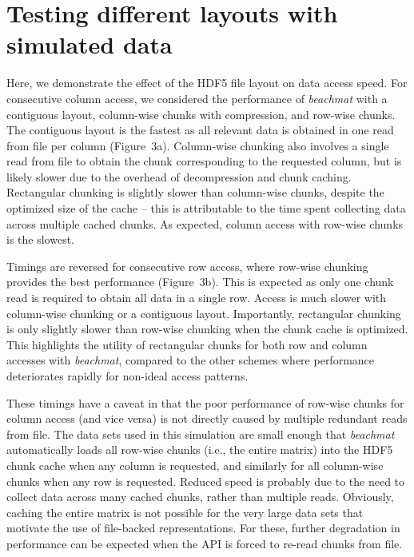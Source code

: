 \documentclass{article}
\newcommand{\beachmat}{\textit{beachmat}}
\begin{document}
\section{Testing different layouts with simulated data}
Here, we demonstrate the effect of the HDF5 file layout on data access speed.
For consecutive column access, we considered the performance of \beachmat{} with a contiguous layout, column-wise chunks with compression, and row-wise chunks.
The contiguous layout is the fastest as all relevant data is obtained in one read from file per column (Figure~3a).
Column-wise chunking also involves a single read from file to obtain the chunk corresponding to the requested column, but is likely slower due to the overhead of decompression and chunk caching.
Rectangular chunking is slightly slower than column-wise chunks, despite the optimized size of the cache -- this is attributable to the time spent collecting data across multiple cached chunks.
As expected, column access with row-wise chunks is the slowest.

Timings are reversed for consecutive row access, where row-wise chunking provides the best performance (Figure~3b).
This is expected as only one chunk read is required to obtain all data in a single row.
Access is much slower with column-wise chunking or a contiguous layout.
Importantly, rectangular chunking is only slightly slower than row-wise chunking when the chunk cache is optimized.
This highlights the utility of rectangular chunks for both row and column accesses with \beachmat{},
compared to the other schemes where performance deteriorates rapidly for non-ideal access patterns.

These timings have a caveat in that the poor performance of row-wise chunks for column access (and vice versa) is not directly caused by multiple redundant reads from file.
The data sets used in this simulation are small enough that \beachmat{} automatically loads all row-wise chunks (i.e., the entire matrix) into the HDF5 chunk cache when any column is requested, and similarly for all column-wise chunks when any row is requested.
Reduced speed is probably due to the need to collect data across many cached chunks, rather than multiple reads. 
Obviously, caching the entire matrix is not possible for the very large data sets that motivate the use of file-backed representations.
For these, further degradation in performance can be expected when the API is forced to re-read chunks from file.




\end{document}
